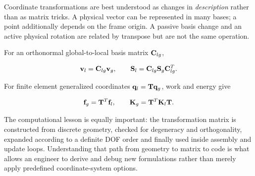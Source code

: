Coordinate transformations are best understood as changes in \emph{description}
rather than as matrix tricks. A physical vector can be represented in many
bases; a point additionally depends on the frame origin. A passive basis change
and an active physical rotation are related by transpose but are not the same
operation.

For an orthonormal global-to-local basis matrix $\mathbf{C}_{lg}$,

\begin{equation*}
\mathbf{v}_l=\mathbf{C}_{lg}\mathbf{v}_g,
\qquad
\mathbf{S}_l=\mathbf{C}_{lg}\mathbf{S}_g\mathbf{C}_{lg}^{T}.
\end{equation*}

For finite element generalized coordinates $\mathbf{q}_l=\mathbf{T}\mathbf{q}_g$, work and
energy give

\begin{equation*}
\mathbf{f}_g=\mathbf{T}^{T}\mathbf{f}_l,
\qquad
\mathbf{K}_g=\mathbf{T}^{T}\mathbf{K}_l\mathbf{T}.
\end{equation*}

The computational lesson is equally important: the transformation matrix is
constructed from discrete geometry, checked for degeneracy and orthogonality,
expanded according to a definite DOF order and finally used inside assembly and
update loops. Understanding that path from geometry to matrix to code is what
allows an engineer to derive and debug new formulations rather than merely apply
predefined coordinate-system options.

